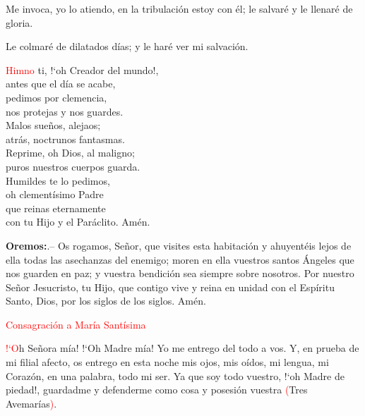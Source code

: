 \documentclass[9pt]{article}
\begin{document}
\begin{multicols}{2}
      Me invoca, yo lo atiendo, en la tribulación estoy con él; le salvaré y le llenaré de gloria.

      Le colmaré de dilatados días; y le haré ver mi salvación.

      \vspace{1mm}

      \begin{otherlanguage}{latin}
            
      \end{otherlanguage}

      \vspace{1mm}

      \noindent\textcolor{red}{Himno}
      ti, {!`}oh Creador del mundo!,\\
      antes que el día se acabe,\\
      pedimos por clemencia,\\
      nos protejas y nos guardes.\\
      Malos sueños, alejaos;\\
      atrás, noctrunos fantasmas.\\
      Reprime, oh Dios, al maligno;\\
      puros nuestros cuerpos guarda.\\
      Humildes te lo pedimos,\\
      oh clementísimo Padre\\
      que reinas eternamente\\
      con tu Hijo y el Paráclito. Amén.

      \vspace{1mm}


      \textbf{Oremos:}.-- Os rogamos, Señor, que visites esta habitación y ahuyentéis lejos de ella todas las asechanzas del enemigo; moren en ella vuestros santos Ángeles
      que nos guarden en paz; y vuestra bendición sea siempre sobre nosotros. Por nuestro Señor Jesucristo, tu Hijo, que contigo vive y reina en unidad
      con el Espíritu Santo, Dios, por los siglos de los siglos. Amén.

      \vspace{1mm}

      \textcolor{red}{Consagración a María Santísima}

      \textcolor{red}{{!`}O}h Señora mía! {!`}Oh Madre mía! Yo me entrego del todo a vos. Y, en prueba de mi filial afecto, os entrego en esta noche mis ojos, mis oídos, mi lengua, mi Corazón,
      en una palabra, todo mi ser. Ya que soy todo vuestro, {!`}oh Madre de piedad!, guardadme y defenderme como cosa y posesión vuestra \textcolor{red}{(}Tres Avemarías\textcolor{red}{)}.
      

\end{multicols}
\end{document}
